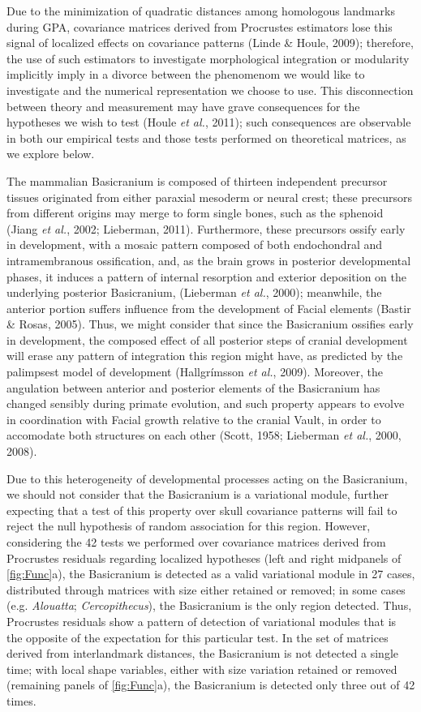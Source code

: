 \documentclass[12pt,]{article}
\begin{document}
Due to the minimization of quadratic distances among homologous
landmarks during GPA, covariance matrices derived from Procrustes
estimators lose this signal of localized effects on covariance patterns
(Linde \& Houle, 2009); therefore, the use of such estimators to
investigate morphological integration or modularity implicitly imply in
a divorce between the phenomenom we would like to investigate and the
numerical representation we choose to use. This disconnection between
theory and measurement may have grave consequences for the hypotheses we
wish to test (Houle \emph{et al.}, 2011); such consequences are
observable in both our empirical tests and those tests performed on
theoretical matrices, as we explore below.

The mammalian Basicranium is composed of thirteen independent precursor
tissues originated from either paraxial mesoderm or neural crest; these
precursors from different origins may merge to form single bones, such
as the sphenoid (Jiang \emph{et al.}, 2002; Lieberman, 2011).
Furthermore, these precursors ossify early in development, with a mosaic
pattern composed of both endochondral and intramembranous ossification,
and, as the brain grows in posterior developmental phases, it induces a
pattern of internal resorption and exterior deposition on the underlying
posterior Basicranium, (Lieberman \emph{et al.}, 2000); meanwhile, the
anterior portion suffers influence from the development of Facial
elements (Bastir \& Rosas, 2005). Thus, we might consider that since the
Basicranium ossifies early in development, the composed effect of all
posterior steps of cranial development will erase any pattern of
integration this region might have, as predicted by the palimpsest model
of development (Hallgrímsson \emph{et al.}, 2009). Moreover, the
angulation between anterior and posterior elements of the Basicranium
has changed sensibly during primate evolution, and such property appears
to evolve in coordination with Facial growth relative to the cranial
Vault, in order to accomodate both structures on each other (Scott,
1958; Lieberman \emph{et al.}, 2000, 2008).

Due to this heterogeneity of developmental processes acting on the
Basicranium, we should not consider that the Basicranium is a
variational module, further expecting that a test of this property over
skull covariance patterns will fail to reject the null hypothesis of
random association for this region. However, considering the 42 tests we
performed over covariance matrices derived from Procrustes residuals
regarding localized hypotheses (left and right midpanels of
\autoref{fig:Func}a), the Basicranium is detected as a valid variational
module in 27 cases, distributed through matrices with size either
retained or removed; in some cases (e.g. \emph{Alouatta};
\emph{Cercopithecus}), the Basicranium is the only region detected.
Thus, Procrustes residuals show a pattern of detection of variational
modules that is the opposite of the expectation for this particular
test. In the set of matrices derived from interlandmark distances, the
Basicranium is not detected a single time; with local shape variables,
either with size variation retained or removed (remaining panels of
\autoref{fig:Func}a), the Basicranium is detected only three out of 42
times.
\end{document}
